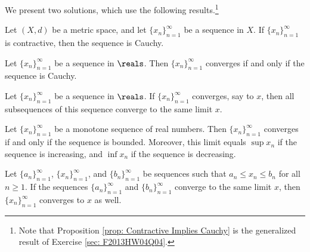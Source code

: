 We present two solutions, which use the following results.\footnote{Note that Proposition \ref{prop: Contractive Implies Cauchy} is the generalized result of Exercise \ref{sec: F2013HW04Q04}.}%

\begin{proposition}%
\label{prop: Contractive Implies Cauchy}
Let $(X,d)$ be a metric space, and let $\{ x_{n} \}_{n=1}^{\infty}$ be a sequence in $X$. If $\{ x_{n} \}_{n=1}^{\infty}$ is contractive, then the sequence is Cauchy.
\end{proposition}

\begin{proposition}
\label{prop: Cauchy Iff Convergent In Reals}
Let $\{ x_{n} \}_{n=1}^{\infty}$ be a sequence in $\reals$. Then $\{ x_{n} \}_{n=1}^{\infty}$ converges if and only if the sequence is Cauchy.
\end{proposition}

\begin{proposition}
\label{prop: Convergent Sequence All Subsequences Converge Same Limit}
Let $\{ x_{n} \}_{n=1}^{\infty}$ be a sequence in $\reals$. If $\{ x_{n} \}_{n=1}^{\infty}$ converges, say to $x$, then all subsequences of this sequence converge to the same limit $x$.
\end{proposition}

\begin{theorem}
\label{thm: Monotone Convergence Theorem}
Let $\{ x_{n} \}_{n=1}^{\infty}$ be a monotone sequence of real numbers. Then $\{ x_{n} \}_{n=1}^{\infty}$ converges if and only if the sequence is bounded. Moreover, this limit equals $\sup x_{n}$ if the sequence is increasing, and $\inf x_{n}$ if the sequence is decreasing.
\end{theorem}

\begin{theorem}
\label{thm: Squeeze Theorem}
Let $\{ a_{n} \}_{n=1}^{\infty}$, $\{ x_{n} \}_{n=1}^{\infty}$, and $\{ b_{n} \}_{n=1}^{\infty}$ be sequences such that $a_{n} \leq x_{n} \leq b_{n}$ for all $n \geq 1$. If the sequences $\{ a_{n} \}_{n=1}^{\infty}$ and $\{ b_{n} \}_{n=1}^{\infty}$ converge to the same limit $x$, then $\{ x_{n} \}_{n=1}^{\infty}$ converges to $x$ as well.
\end{theorem}

